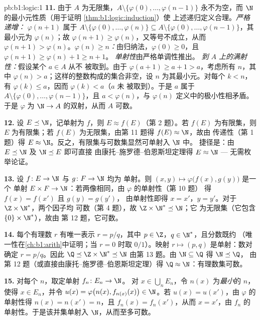 \begin{solution}{pb:b1:logic:1}
\textbf{11.} 由于 $A$ 为无限集，$A \setminus \{\varphi(0), \dots,
\varphi(n - 1)\}$ 永不为空，而
$\N$ 的最小元性质（用于证明 \cref{thm:b1:logic:induction}）使
上述递归定义合理。\emph{严格递增：}
$\varphi(n + 1)$ 属于 $A \setminus \{\varphi(0), \dots,
\varphi(n)\} \subseteq A \setminus \{\varphi(0), \dots, \varphi(n -
1)\}$，其最小元为 $\varphi(n)$；故 $\varphi(n + 1) \geq
\varphi(n)$，又等号不成立，从而 $\varphi(n+1) >
\varphi(n)$。\emph{$\varphi(n) \geq n$：}由归纳法，$\varphi(0)
\geq 0$，且 $\varphi(n + 1) \geq \varphi(n) + 1 \geq n + 1$。
\emph{单射性}由严格单调性推出。
\emph{到 $A$ 上的满射性：}假设某个 $a \in A$ 从不
被取到。由于 $\varphi(a + 1) \geq a + 1 > a$，考虑所有 $n$，其中
$\varphi(n) > a$；这样的整数构成的集合非空，设 $n$ 为其最小元。对每个
$k < n$，有 $\varphi(k) \leq a$，因而 $\varphi(k) < a$（$a$ 未
被取到）。于是 $a$ 属于 $A \setminus \{\varphi(0), \dots,
\varphi(n - 1)\}$，且 $a < \varphi(n)$，与
$\varphi(n)$ 定义中的极小性相矛盾。于是 $\varphi$ 为 $\N \to A$ 的双射，从而
$A$ 可数。

\textbf{12.} 设 $E \preceq \N$，记单射为 $f$，则 $E \approx
f(E)$（第 2 题）。若 $f(E)$ 为有限集，则 $E$ 为有限集；若 $f(E)$
为无限集，由第 11 题得 $f(E) \approx \N$，故由
传递性（第 1 题）得 $E \approx \N$。反之，有限集与可数集显然可单射入 $\N$ 中。
捷径是：由 $E \preceq \N$ 及 $\N
\preceq E$ 即可直接
由康托–施罗德–伯恩斯坦定理得 $E \approx \N$ --- 无需枚举论证。

\textbf{13.} 设 $f \colon E \to \N$ 与 $g \colon F \to \N$ 均为
单射。则 $(x, y) \mapsto \varphi\bigl(f(x), g(y)\bigr)$ 是一个
单射 $E \times F \to \N$：若两像相同，由 $\varphi$ 的单射性（第 10 题）
得 $f(x) = f(x')$ 且 $g(y) = g(y')$，
由单射性即得 $x = x'$，$y = y'$。对于 $\Z \times \N^*$，两个因子均
可数（第 4 题），故 $\Z \times \N^* \preceq \N$；它
为无限集（它包含 $\{0\} \times \N^*$），故由
第 12 题，它可数。

\textbf{14.} 每个有理数 $r$ 有唯一表示 $r =
p/q$，其中 $p \in \Z$，$q \in \N^*$，且分数既约
（唯一性在\cref{ch:b1:arith}中证明；当 $r = 0$ 时取
$0/1$）。映射 $r \mapsto (p, q)$ 是单射：数对
确定 $r = p/q$。因此 $\Q \preceq \Z \times \N^* \preceq \N$
由第 13 题。由 $\N \subseteq \Q$ 得 $\N \preceq \Q$，
由第 12 题（或直接由康托–施罗德–伯恩斯坦定理）得 $\Q
\approx \N$：有理数集可数。

\textbf{15.} 对每个 $n$，取定单射 $f_n \colon E_n \to \N$。
对 $x \in \bigcup_n E_n$，令 $n(x)$ 为\emph{最小}的 $n$，使得
$x \in E_n$，并令 $u(x) = \varphi\bigl(n(x), f_{n(x)}(x)\bigr)
\in \N$。若 $u(x) = u(x')$，由 $\varphi$ 的单射性得 $n(x) =
n(x') = n$，且 $f_n(x) = f_n(x')$，从而
$x = x'$，由 $f_n$ 的单射性。于是该并集单射入 $\N$，从而至多可数。


\end{solution}
